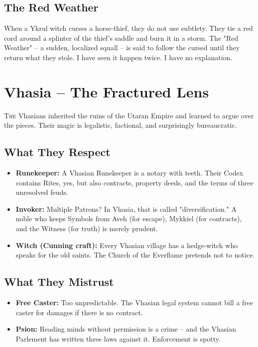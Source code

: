 \documentclass[10pt,a5paper]{book}
\begin{document}
\subsection*{The Red Weather}
When a Ykrul witch curses a horse-thief, they do not use subtlety. They tie a red cord around a splinter of the thief's saddle and burn it in a storm. The "Red Weather" -- a sudden, localized squall -- is said to follow the cursed until they return what they stole. I have seen it happen twice. I have no explanation.

\section{Vhasia -- The Fractured Lens}

\lettrine{T}{he} Vhasians inherited the ruins of the Utaran Empire and learned to argue over the pieces. Their magic is legalistic, factional, and surprisingly bureaucratic.

\subsection*{What They Respect}
\begin{itemize}
    \item \textbf{Runekeeper:} A Vhasian Runekeeper is a notary with teeth. Their Codex contains Rites, yes, but also contracts, property deeds, and the terms of three unresolved feuds.
    \item \textbf{Invoker:} Multiple Patrons? In Vhasia, that is called "diversification." A noble who keeps Symbols from Aveh (for escape), Mykkiel (for contracts), and the Witness (for truth) is merely prudent.
    \item \textbf{Witch (Cunning craft):} Every Vhasian village has a hedge-witch who speaks for the old saints. The Church of the Everflame pretends not to notice.
\end{itemize}

\subsection*{What They Mistrust}
\begin{itemize}
    \item \textbf{Free Caster:} Too unpredictable. The Vhasian legal system cannot bill a free caster for damages if there is no contract.
    \item \textbf{Psion:} Reading minds without permission is a crime -- and the Vhasian Parlement has written three laws against it. Enforcement is spotty.
\end{itemize}
\end{document}
